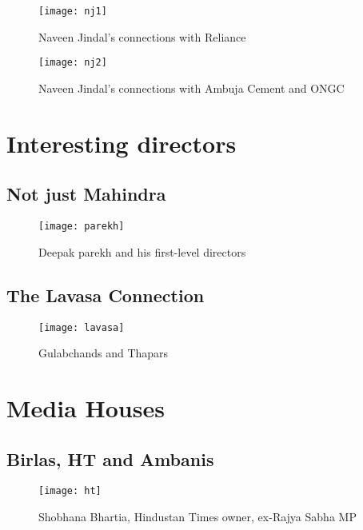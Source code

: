 \begin{figure}[H]
\begin{center}  
\texttt{[image: nj1]} 
\caption{Naveen Jindal's connections with Reliance}
\label{fig:nj1}
\end{center}
\end{figure}

\begin{figure}[H]
\begin{center}  
\texttt{[image: nj2]} 
\caption{Naveen Jindal's connections with Ambuja Cement and ONGC}
\label{fig:nj2}
\end{center}
\end{figure}


\section{Interesting directors}

\subsection{Not just Mahindra}
\begin{figure}[H]
\begin{center}  
\texttt{[image: parekh]} 
\caption{Deepak parekh and his first-level directors}
\label{fig:parekh}
\end{center}
\end{figure}


\subsection{The Lavasa Connection}
\begin{figure}[H]
\begin{center}  
\texttt{[image: lavasa]} 
\caption{Gulabchands and Thapars}
\label{fig:lavasa}
\end{center}
\end{figure}


\section{Media Houses}

\subsection{Birlas, HT and Ambanis}

\begin{figure}[H]
\begin{center}  
\texttt{[image: ht]} 
\caption{Shobhana Bhartia, Hindustan Times owner, ex-Rajya Sabha MP}
\label{fig:ht}
\end{center}
\end{figure}

